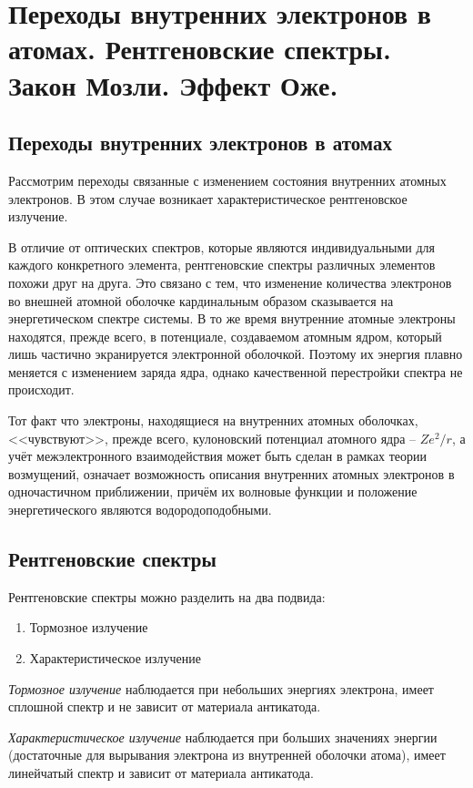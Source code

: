\chapter{Переходы внутренних электронов в атомах. Рентгеновские спектры. 
Закон Мозли. Эффект Оже.}

\section{Переходы внутренних электронов в атомах}
Рассмотрим переходы связанные с изменением состояния внутренних атомных 
электронов. В этом случае возникает характеристическое рентгеновское 
излучение. 

В отличие от оптических спектров, которые являются индивидуальными для 
каждого конкретного элемента, рентгеновские спектры различных элементов 
похожи друг на друга. Это связано с тем, что изменение количества 
электронов во внешней атомной оболочке кардинальным образом сказывается на 
энергетическом спектре системы. В то же время внутренние атомные электроны 
находятся, прежде всего, в потенциале, создаваемом атомным ядром, который 
лишь частично экранируется электронной оболочкой. Поэтому их энергия 
плавно меняется с изменением заряда ядра, однако качественной перестройки 
спектра не происходит.

Тот факт что электроны, находящиеся на внутренних атомных оболочках, 
<<чувствуют>>, прежде всего, кулоновский потенциал атомного ядра -- 
\( Ze^2 / r \), а учёт межэлектронного взаимодействия может быть сделан в 
рамках теории возмущений, означает возможность описания внутренних атомных 
электронов в одночастичном приближении, причём их волновые функции и 
положение энергетического являются водородоподобными.

\section{Рентгеновские спектры}
Рентгеновские спектры можно разделить на два подвида:
\begin{enumerate}
	\item Тормозное излучение
	\item Характеристическое излучение
\end{enumerate}

\emph{Тормозное излучение} наблюдается при небольших энергиях электрона, 
имеет сплошной спектр и не зависит от материала антикатода.

\emph{Характеристическое излучение} наблюдается при больших значениях 
энергии (достаточные для вырывания электрона из внутренней оболочки атома), 
имеет линейчатый спектр и зависит от материала антикатода. 

